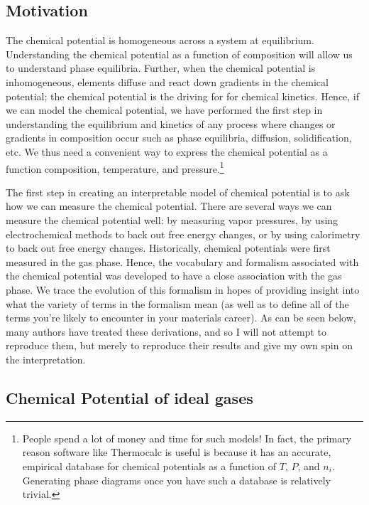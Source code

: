 \documentclass[12pt]{article}
\begin{document}
\subsection{Motivation}
The chemical potential is homogeneous across a system at equilibrium. Understanding the chemical potential as a function of composition will allow us to understand phase equilibria. Further, when the chemical potential is inhomogeneous, elements diffuse and react down gradients in the chemical potential; the chemical potential is the driving for for chemical kinetics. Hence, if we can model the chemical potential, we have performed the first step in understanding the equilibrium and kinetics of any process where changes or gradients in composition occur such as phase equilibria, diffusion, solidification, etc. We thus need a convenient way to express the chemical potential as a function composition, temperature, and pressure.\footnote{People spend a lot of money and time for such models! In fact, the primary reason software like Thermocalc is useful is because it has an accurate, empirical database for chemical potentials as a function of $T$, $P$, and $n_i$. Generating phase diagrams once you have such a database is relatively trivial.}

The first step in creating an interpretable model of chemical potential is to ask how we can measure the chemical potential. There are several ways we can measure the chemical potential well: by measuring vapor pressures, by using electrochemical methods to back out free energy changes, or by using calorimetry to back out free energy changes. Historically, chemical potentials were first measured in the gas phase. Hence, the vocabulary and formalism associated with the chemical potential was developed to have a close association with the gas phase. We trace the evolution of this formalism in hopes of providing insight into what the variety of terms in the formalism mean (as well as to define all of the terms you're likely to encounter in your materials career). As can be seen below, many authors have treated these derivations, and so I will not attempt to reproduce them, but merely to reproduce their results and give my own spin on the interpretation.

\subsection{Chemical Potential of ideal gases}
\end{document}
